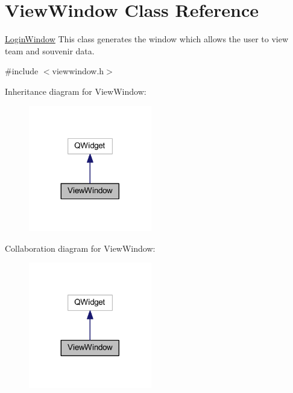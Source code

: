 \hypertarget{class_view_window}{}\section{View\+Window Class Reference}
\label{class_view_window}


\mbox{\hyperlink{class_login_window}{Login\+Window}} This class generates the window which allows the user to view team and souvenir data.  




{\ttfamily \#include $<$viewwindow.\+h$>$}



Inheritance diagram for View\+Window\+:\nopagebreak
\begin{figure}[H]
\begin{center}
\leavevmode
\includegraphics[width=152pt]{class_view_window__inherit__graph}
\end{center}
\end{figure}


Collaboration diagram for View\+Window\+:\nopagebreak
\begin{figure}[H]
\begin{center}
\leavevmode
\includegraphics[width=152pt]{class_view_window__coll__graph}
\end{center}
\end{figure}
